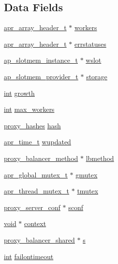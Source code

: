 \subsection*{Data Fields}
\begin{DoxyCompactItemize}
\item 
\hyperlink{structapr__array__header__t}{apr\+\_\+array\+\_\+header\+\_\+t} $\ast$ \hyperlink{structproxy__balancer_ae3b2618b5893903a9ddd19f77473efde}{workers}
\item 
\hyperlink{structapr__array__header__t}{apr\+\_\+array\+\_\+header\+\_\+t} $\ast$ \hyperlink{structproxy__balancer_ab37f34a9b441ec4a6b7f4175073085f1}{errstatuses}
\item 
\hyperlink{structap__slotmem__instance__t}{ap\+\_\+slotmem\+\_\+instance\+\_\+t} $\ast$ \hyperlink{structproxy__balancer_a1efe916fef7b26069402b258f797a592}{wslot}
\item 
\hyperlink{structap__slotmem__provider__t}{ap\+\_\+slotmem\+\_\+provider\+\_\+t} $\ast$ \hyperlink{structproxy__balancer_a5619840ed182f2eb5c25b0132f7f0b11}{storage}
\item 
\hyperlink{pcre_8txt_a42dfa4ff673c82d8efe7144098fbc198}{int} \hyperlink{structproxy__balancer_a140af17fc460b5ebe2bbd492b26586b4}{growth}
\item 
\hyperlink{pcre_8txt_a42dfa4ff673c82d8efe7144098fbc198}{int} \hyperlink{structproxy__balancer_a35e061500c518bf760cb91a3e008d545}{max\+\_\+workers}
\item 
\hyperlink{structproxy__hashes}{proxy\+\_\+hashes} \hyperlink{structproxy__balancer_afc9835916ce7788d2ef378d2483eaaed}{hash}
\item 
\hyperlink{group__apr__time_gadb4bde16055748190eae190c55aa02bb}{apr\+\_\+time\+\_\+t} \hyperlink{structproxy__balancer_a539fbce3fb0d740a3978b62d77afc4fd}{wupdated}
\item 
\hyperlink{structproxy__balancer__method}{proxy\+\_\+balancer\+\_\+method} $\ast$ \hyperlink{structproxy__balancer_ac9c801692c0ebc6265cbf20adab60531}{lbmethod}
\item 
\hyperlink{structapr__global__mutex__t}{apr\+\_\+global\+\_\+mutex\+\_\+t} $\ast$ \hyperlink{structproxy__balancer_ab9cd1803a1a65c1afeaa481a13fdc24c}{gmutex}
\item 
\hyperlink{structapr__thread__mutex__t}{apr\+\_\+thread\+\_\+mutex\+\_\+t} $\ast$ \hyperlink{structproxy__balancer_ac81be41fd3673615e5ddc55e45de41e1}{tmutex}
\item 
\hyperlink{structproxy__server__conf}{proxy\+\_\+server\+\_\+conf} $\ast$ \hyperlink{structproxy__balancer_ab4811966be4fc0392d4353414d1250e3}{sconf}
\item 
\hyperlink{group__MOD__ISAPI_gacd6cdbf73df3d9eed42fa493d9b621a6}{void} $\ast$ \hyperlink{structproxy__balancer_ac92e39dc989daaf45881dde841cdfca1}{context}
\item 
\hyperlink{structproxy__balancer__shared}{proxy\+\_\+balancer\+\_\+shared} $\ast$ \hyperlink{structproxy__balancer_a4604afa7d99a6cc1f411eb723f35e458}{s}
\item 
\hyperlink{pcre_8txt_a42dfa4ff673c82d8efe7144098fbc198}{int} \hyperlink{structproxy__balancer_af02e88415cf87c444094d7cbb19fd999}{failontimeout}
\end{DoxyCompactItemize}


